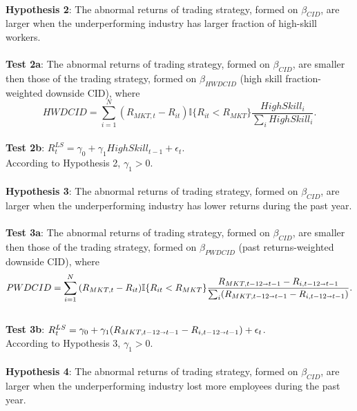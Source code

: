 \documentclass[12pt]{article}
\begin{document}
\paragraph{}
\textbf{Hypothesis 2}: The abnormal returns of trading strategy, formed on $\beta_{CID}$, are larger when the underperforming industry has larger fraction of high-skill workers.
\paragraph{}
\textbf{Test 2a}: The abnormal returns of trading strategy, formed on $\beta_{CID}$, are smaller then those of the trading strategy, formed on $\beta_{HWDCID}$ (high skill fraction-weighted downside CID), where $$HWDCID = \sum^{N}_{i=1}{(R_{MKT,t}-R_{it}) \mathbb{I}\{R_{it}<R_{MKT}\} \frac{HighSkill_i}{\sum_{i} HighSkill_i}}.$$
\\ \-\hspace{0.3cm}
\textbf{Test 2b}: $R^{LS}_{t} = \gamma_0 +\gamma_1 HighSkill_{t-1}+\epsilon_t$. \\ 
According to Hypothesis 2, $\gamma_1>0$.
\paragraph{}
\textbf{Hypothesis 3}: The abnormal returns of trading strategy, formed on $\beta_{CID}$, are larger when the underperforming industry has lower returns during the past year.
\paragraph{}
\textbf{Test 3a}: The abnormal returns of trading strategy, formed on $\beta_{CID}$, are smaller then those of the trading strategy, formed on $\beta_{PWDCID}$ (past returns-weighted downside CID), where $$PWDCID = \sum^{N}_{i=1}{(R_{MKT,t}-R_{it}) \mathbb{I}\{R_{it}<R_{MKT}\} \frac{R_{MKT, t-12 \shortrightarrow t-1} - R_{i, t-12 \shortrightarrow t-1}}{\sum_{i} (R_{MKT, t-12 \shortrightarrow t-1} - R_{i, t-12 \shortrightarrow t-1}) }}.$$
\\ \-\hspace{0.3cm}
\textbf{Test 3b}: $R^{LS}_{t} = \gamma_0 +\gamma_1 (R_{MKT, t-12 \shortrightarrow t-1} - R_{i, t-12 \shortrightarrow t-1})+\epsilon_t$. \\ 
According to Hypothesis 3, $\gamma_1>0$.
\paragraph{}
\textbf{Hypothesis 4}: The abnormal returns of trading strategy, formed on $\beta_{CID}$, are larger when the underperforming industry lost more employees during the past year.
\end{document}
